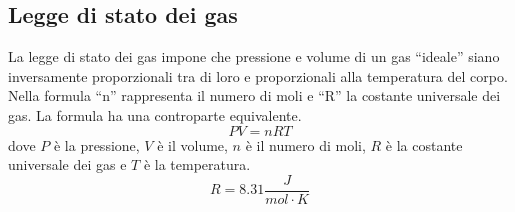\documentclass[a4paper]{article}
\theoremstyle{break}
\theoremstyle{break}
\theoremstyle{break}
\theoremstyle{break}
\begin{document}
\subsection{Legge di stato dei gas}
La legge di stato dei gas impone che pressione e volume di un gas “ideale” siano inversamente
proporzionali tra di loro e proporzionali alla temperatura del corpo. Nella formula “n” rappresenta il
numero di moli e “R” la costante universale dei gas. La formula ha una controparte equivalente.
\[
  PV = nRT
\]
dove \( P \) è la pressione, \( V \) è il volume, \( n \) è il numero di moli, \( R \) è la costante universale dei gas e \( T \) è la temperatura.
\[
  R = 8.31 \frac{J}{mol \cdot K}
\] 
\end{document}
